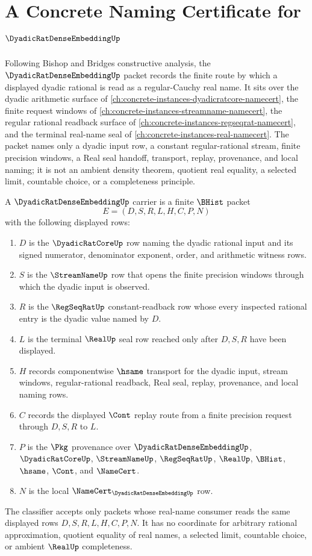 \chapter{A Concrete Naming Certificate for $\DyadicRatDenseEmbeddingUp$}
\label{ch:concrete-instances-dyadic-rat-dense-embedding-namecert}

Following Bishop and Bridges constructive analysis, the $\DyadicRatDenseEmbeddingUp$ packet records the finite route by which a displayed dyadic rational is read as a regular-Cauchy real name. It sits over the dyadic arithmetic surface of \autoref{ch:concrete-instances-dyadicratcore-namecert}, the finite request windows of \autoref{ch:concrete-instances-streamname-namecert}, the regular rational readback surface of \autoref{ch:concrete-instances-regseqrat-namecert}, and the terminal real-name seal of \autoref{ch:concrete-instances-real-namecert}. The packet names only a dyadic input row, a constant regular-rational stream, finite precision windows, a Real seal handoff, transport, replay, provenance, and local naming; it is not an ambient density theorem, quotient real equality, a selected limit, countable choice, or a completeness principle.

\begin{definition}
\label{def:dyadic-rat-dense-embedding-carrier}
A $\DyadicRatDenseEmbeddingUp$ carrier is a finite $\BHist$ packet
$$
E=(D,S,R,L,H,C,P,N)
$$
with the following displayed rows:
\begin{enumerate}
\item $D$ is the $\DyadicRatCoreUp$ row naming the dyadic rational input and its signed numerator, denominator exponent, order, and arithmetic witness rows.
\item $S$ is the $\StreamNameUp$ row that opens the finite precision windows through which the dyadic input is observed.
\item $R$ is the $\RegSeqRatUp$ constant-readback row whose every inspected rational entry is the dyadic value named by $D$.
\item $L$ is the terminal $\RealUp$ seal row reached only after $D,S,R$ have been displayed.
\item $H$ records componentwise $\hsame$ transport for the dyadic input, stream windows, regular-rational readback, Real seal, replay, provenance, and local naming rows.
\item $C$ records the displayed $\Cont$ replay route from a finite precision request through $D,S,R$ to $L$.
\item $P$ is the $\Pkg$ provenance over $\DyadicRatDenseEmbeddingUp$, $\DyadicRatCoreUp$, $\StreamNameUp$, $\RegSeqRatUp$, $\RealUp$, $\BHist$, $\hsame$, $\Cont$, and $\NameCert$.
\item $N$ is the local $\NameCert_{\DyadicRatDenseEmbeddingUp}$ row.
\end{enumerate}
The classifier accepts only packets whose real-name consumer reads the same displayed rows $D,S,R,L,H,C,P,N$. It has no coordinate for arbitrary rational approximation, quotient equality of real names, a selected limit, countable choice, or ambient $\RealUp$ completeness.
\end{definition}

